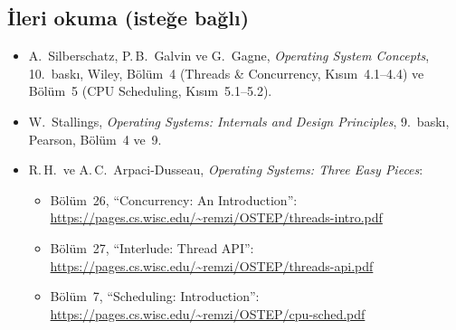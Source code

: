\documentclass[11pt,a4paper]{article}
\begin{document}
\subsection*{İleri okuma (isteğe bağlı)}
\begin{itemize}
  \item A.\ Silberschatz, P.\,B.\ Galvin ve G.\ Gagne, \emph{Operating System Concepts}, 10.\ baskı, Wiley, Bölüm~4 (Threads \& Concurrency, Kısım~4.1--4.4) ve Bölüm~5 (CPU Scheduling, Kısım~5.1--5.2).
  \item W.\ Stallings, \emph{Operating Systems: Internals and Design Principles}, 9.\ baskı, Pearson, Bölüm~4 ve~9.
  \item R.\,H.\ ve A.\,C.\ Arpaci-Dusseau, \emph{Operating Systems: Three Easy Pieces}:
  \begin{itemize}
    \item Bölüm~26, ``Concurrency: An Introduction'': \url{https://pages.cs.wisc.edu/~remzi/OSTEP/threads-intro.pdf}
    \item Bölüm~27, ``Interlude: Thread API'': \url{https://pages.cs.wisc.edu/~remzi/OSTEP/threads-api.pdf}
    \item Bölüm~7, ``Scheduling: Introduction'': \url{https://pages.cs.wisc.edu/~remzi/OSTEP/cpu-sched.pdf}
  \end{itemize}
\end{itemize}
\end{document}
